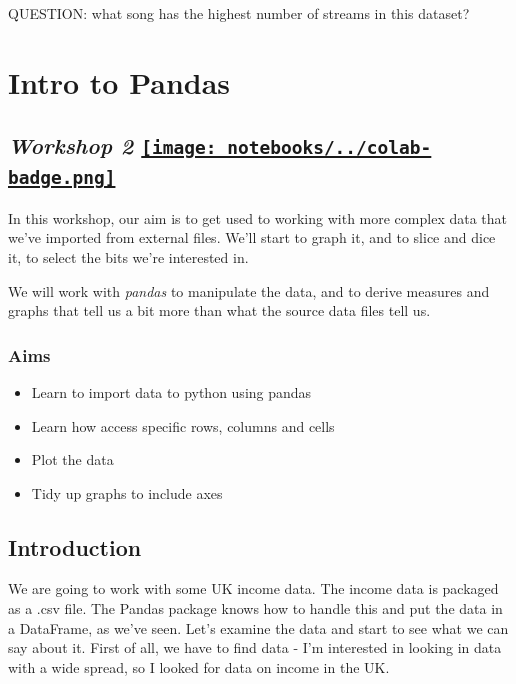 \documentclass[
  letterpaper,
  DIV=11,
  numbers=noendperiod]{scrreprt}
\providecommand{\tightlist}{%
  \setlength{\itemsep}{0pt}\setlength{\parskip}{0pt}}\usepackage{longtable,booktabs,array}
\begin{document}
QUESTION: what song has the highest number of streams in this dataset?


\hypertarget{intro-to-pandas}{%
\chapter{Intro to Pandas}\label{intro-to-pandas}}

\hypertarget{workshop-2-open-in-colab}{%
\section[\emph{Workshop 2} ]{\texorpdfstring{\emph{Workshop 2}
\href{https://colab.research.google.com/github/oballinger/QM2/blob/main/notebooks/W02.\%20Pandas.ipynb}{\protect\texttt{[image: notebooks/../colab-badge.png]}}}{Workshop 2 Open In Colab}}\label{workshop-2-open-in-colab}}

In this workshop, our aim is to get used to working with more complex
data that we've imported from external files. We'll start to graph it,
and to slice and dice it, to select the bits we're interested in.

We will work with \emph{pandas} to manipulate the data, and to derive
measures and graphs that tell us a bit more than what the source data
files tell us.

\hypertarget{aims}{%
\subsection{Aims}\label{aims}}

\begin{itemize}
\tightlist
\item
  Learn to import data to python using pandas
\item
  Learn how access specific rows, columns and cells
\item
  Plot the data
\item
  Tidy up graphs to include axes
\end{itemize}

\hypertarget{introduction}{%
\section{Introduction}\label{introduction}}

We are going to work with some UK income data. The income data is
packaged as a .csv file. The Pandas package knows how to handle this and
put the data in a DataFrame, as we've seen. Let's examine the data and
start to see what we can say about it. First of all, we have to find
data - I'm interested in looking in data with a wide spread, so I looked
for data on income in the UK.
\end{document}
